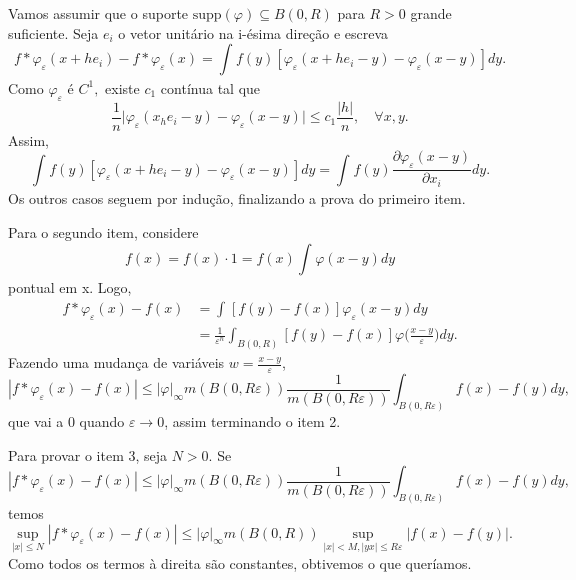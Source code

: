\documentclass[measure_theory.tex]{subfiles}
\begin{document}
\begin{proof*}
	Vamos assumir que o suporte \(\mathrm{supp}(\varphi )\subseteq B(0, R)\) para \(R>0\) grande suficiente. Seja \(e_{i}\) o vetor unitário na i-ésima direção e escreva
	\[
		f*\varphi_{\varepsilon }(x+he_{i}) - f*\varphi_{\varepsilon }(x) = \int_{}^{}f(y)[\varphi_{\varepsilon }(x+he_{i}-y) - \varphi_{\varepsilon }(x-y)]dy.
	\]
	Como \(\varphi_{\varepsilon }\) é \(C^{1},\) existe \(c_{1}\) contínua tal que
	\[
		\frac{1}{n}\biggl\vert \varphi _{\varepsilon }(x_he_{i}-y) - \varphi _{\varepsilon }(x-y) \biggr\vert\leq c_1\frac{|h|}{n},\quad \forall x, y.
	\]
	Assim,
	\[
		\int_{}^{}f(y)[\varphi_{\varepsilon }(x+he_{i}-y) - \varphi_{\varepsilon }(x-y)]dy = \int_{}^{}f(y)\frac{\partial \varphi_{\varepsilon }(x-y)}{\partial x_{i}}dy.
	\]
	Os outros casos seguem por indução, finalizando a prova do primeiro item.

	Para o segundo item, considere
	\[
		f(x) = f(x)\cdot 1=f(x)\int_{}^{}\varphi (x-y)dy
	\]
	pontual em x. Logo,
	\begin{align*}
		f*\varphi_{\varepsilon }(x) - f(x) & = \int_{}^{}[f(y)-f(x)]\varphi_\varepsilon  (x-y)dy                                                       \\
		                                   & = \frac{1}{\varepsilon ^{n}}\int_{B(0, R)}^{}[f(y)-f(x)]\varphi \biggl(\frac{x-y}{\varepsilon }\biggr)dy.
	\end{align*}
	Fazendo uma mudança de variáveis \(w=\frac{x-y}{\varepsilon }\),
	\[
		|f*\varphi _{\varepsilon }(x)-f(x)|\leq |\varphi |_{\infty}m(B(0, R\varepsilon ))\frac{1}{m(B(0, R\varepsilon ))}\int_{B(0, R\varepsilon )}^{}f(x)-f(y)dy,
	\]
	que vai a 0 quando \(\varepsilon \to 0\), assim terminando o item 2.

	Para provar o item 3, seja \(N > 0\). Se
	\[
		|f*\varphi _{\varepsilon }(x)-f(x)|\leq |\varphi |_{\infty}m(B(0, R\varepsilon ))\frac{1}{m(B(0, R\varepsilon ))}\int_{B(0, R\varepsilon )}^{}f(x)-f(y)dy,
	\]
	temos
	\[
		\sup_{|x|\leq N}|f*\varphi_{\varepsilon }(x) - f(x)|\leq |\varphi |_{\infty}m(B(0, R))\sup_{|x|<M, |yx|\leq R\varepsilon }|f(x)-f(y)|.
	\]
	Como todos os termos à direita são constantes, obtivemos o que queríamos.


\end{proof*}
\end{document}
